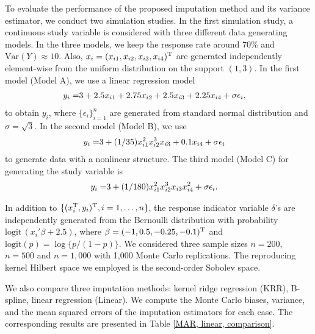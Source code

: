 \documentclass[12pt]{article}
\newcommand{\bx}{{x}}
\newcommand{\logit}{\mathrm{logit\,}}
\def\trans{^{\rm T}}
\begin{document}
To evaluate the performance of the proposed imputation method and its variance estimator, we conduct two simulation studies. In the first simulation study, a continuous study variable is considered with three different data generating models.   In the three models, we keep the response rate around $70\%$ and $\mbox{Var}(Y) \approx 10$. Also, $\bx_{i} =  (x_{i1}, x_{i2}, x_{i3}, x_{i4})\trans$ are generated independently {element-wise} from the {uniform} distribution on the support $(1,3)$. In the first model (Model A), we use a linear regression model 
\begin{align}
y_{i} =& 3 + 2.5x_{i1} + 2.75 x_{i2} +  2.5 x_{i3} + 2.25 x_{i4} + \sigma\epsilon_{i},\notag
\end{align}
to obtain $y_i$, 
where $\{\epsilon_{i}\}_{i=1}^{n}$ are generated from standard normal distribution and $\sigma = \sqrt{3}$. In the second model  (Model B), we use  \begin{align}
y_{i} =& 3 + (1/35)x_{i1}^{2}x_{i2}^{3}x_{i3} +  0.1x_{i4} + \sigma\epsilon_{i} \notag
\end{align}
to generate data with a {nonlinear} structure. The third model  (Model C) for generating the study variable is 
\begin{align}
y_{i} =& 3 + (1/180)x_{i1}^{2}x_{i2}^{3}x_{i3}x_{i4}^{2} + \sigma\epsilon_{i}.\notag
\end{align}


In addition to $\{(x_i\trans, y_i)\trans, i = 1, \ldots, n\}$, the response indicator variable $\delta$'s are independently generated from the {Bernoulli} distribution with probability $\logit(\bx_i' \beta + 2.5)$, where  ${\beta} = (-1, 0.5, -0.25, -0.1)\trans$ and $\mbox{logit}(p) = \log\{p / (1-p)\}$. We considered three sample sizes $n = 200$, $n = 500$ and $n = 1,000$ with 1,000 Monte Carlo replications. The reproducing kernel Hilbert space we employed is the second-order Sobolev space. 

We also compare three imputation methods: kernel ridge regression (KRR), B-spline, linear regression (Linear). We compute the Monte Carlo biases, variance, and the mean squared {errors} of the imputation estimators for each case. 
The corresponding results are presented in   Table \ref{MAR, linear, comparison}.  
\end{document}
